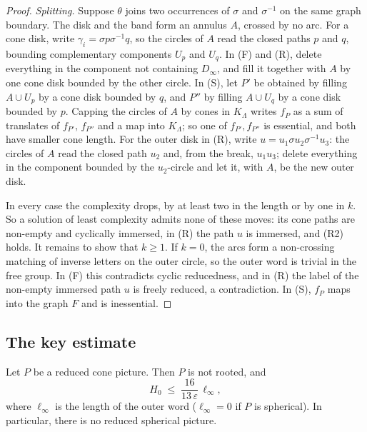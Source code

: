 \documentclass[11pt]{article}
\theoremstyle{definition}
\theoremstyle{plain}
\newcommand{\eps}{\varepsilon}
\begin{document}
\begin{proof}
\emph{Splitting.} Suppose $\theta$ joins two occurrences of $\sigma$ and $\sigma^{-1}$ on the same graph boundary. The disk and the band form an annulus $A$, crossed by no arc. For a cone disk, write $\gamma_i=\sigma p\sigma^{-1}q$, so the circles of $A$ read the closed paths $p$ and $q$, bounding complementary components $U_p$ and $U_q$. In (F) and (R), delete everything in the component not containing $D_\infty$, and fill it together with $A$ by one cone disk bounded by the other circle. In (S), let $P'$ be obtained by filling $A\cup U_p$ by a cone disk bounded by $q$, and $P''$ by filling $A\cup U_q$ by a cone disk bounded by $p$. Capping the circles of $A$ by cones in $K_\Lambda$ writes $f_P$ as a sum of translates of $f_{P'}$, $f_{P''}$ and a map into $K_\Lambda$; so one of $f_{P'},f_{P''}$ is essential, and both have smaller cone length. For the outer disk in (R), write $u=u_1\sigma u_2\sigma^{-1}u_3$: the circles of $A$ read the closed path $u_2$ and, from the break, $u_1u_3$; delete everything in the component bounded by the $u_2$-circle and let it, with $A$, be the new outer disk.

In every case the complexity drops, by at least two in the length or by one in $k$. So a solution of least complexity admits none of these moves: its cone paths are non-empty and cyclically immersed, in (R) the path $u$ is immersed, and (R2) holds. It remains to show that $k\ge1$. If $k=0$, the arcs form a non-crossing matching of inverse letters on the outer circle, so the outer word is trivial in the free group. In (F) this contradicts cyclic reducedness, and in (R) the label of the non-empty immersed path $u$ is freely reduced, a contradiction. In (S), $f_P$ maps into the graph $F$ and is inessential.
\end{proof}

\subsection{The key estimate}
\begin{proposition}\label{prop:key}
Let $P$ be a reduced cone picture. Then $P$ is not rooted, and
\[
H_0\;\le\;\frac{16}{13\,\eps}\,\ell_\infty ,
\]
where $\ell_\infty$ is the length of the outer word ($\ell_\infty=0$ if $P$ is spherical). In particular, there is no reduced spherical picture.
\end{proposition}
\end{document}
